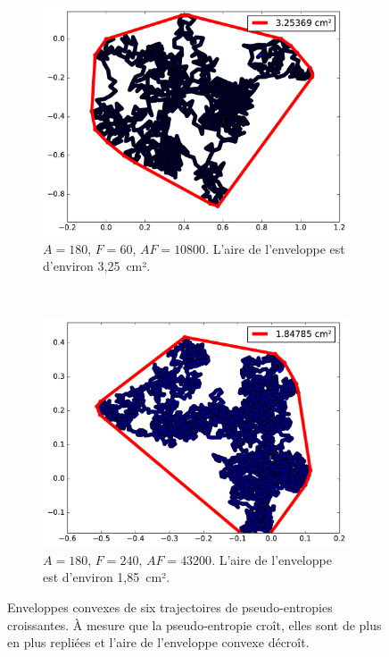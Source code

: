 \begin{figure}[htb]
\begin{subfigure}[t]{\subImgWarea}
			\label{fig:areaTraj_219_90_8}
		\end{subfigure}
		~
		\begin{subfigure}[t]{\subImgWarea}
			\centering
			\includegraphics[width=\textwidth]{figures/ch3/areaTraj_219_180_60}
			\caption[Enveloppe convexe, $A = 180$, $F=60$]{$A = 180$, $F=60$, $AF=10800$. L'aire de l'enveloppe est d'environ 3,25~cm².}
			\label{fig:areaTraj_219_180_60}
		\end{subfigure}
		~
		\begin{subfigure}[t]{\subImgWarea}
			\centering
			\includegraphics[width=\textwidth]{figures/ch3/areaTraj_219_180_240}
			\caption[Enveloppe convexe, $A = 180$, $F=240$]{$A = 180$, $F=240$, $AF=43200$. L'aire de l'enveloppe est d'environ 1,85~cm².}
			\label{fig:areaTraj_219_180_240}
		\end{subfigure}
		\caption[Enveloppes convexes]{Enveloppes convexes de six trajectoires de pseudo-entropies croissantes. À mesure que la pseudo-entropie croît, elles sont de plus en plus \og repliées \fg{} et l'aire de l'enveloppe convexe décroît.}
		\label{fig:trajAreas}
	\end{figure}
	
